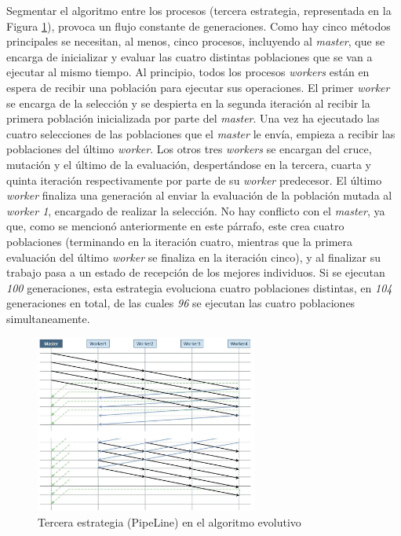 	Segmentar el algoritmo entre los procesos (tercera estrategia, representada en la Figura \ref{fig:pev_mpi3}), provoca un flujo constante de generaciones. Como hay cinco métodos principales se necesitan, al menos, cinco procesos, incluyendo al \textit{master}, que se encarga de inicializar y evaluar las cuatro distintas poblaciones que se van a ejecutar al mismo tiempo. Al principio, todos los procesos \textit{workers} están en espera de recibir una población para ejecutar sus operaciones. El primer \textit{worker} se encarga de la selección y se despierta en la segunda iteración al recibir la primera población inicializada por parte del \textit{master}. Una vez ha ejecutado las cuatro selecciones de las poblaciones que el \textit{master} le envía, empieza a recibir las poblaciones del último \textit{worker}. Los otros tres \textit{workers} se encargan del cruce, mutación y el último de la evaluación, despertándose en la tercera, cuarta y quinta iteración respectivamente por parte de su \textit{worker} predecesor. El último \textit{worker} finaliza una generación al enviar la evaluación de la población mutada al \textit{worker 1}, encargado de realizar la selección. No hay conflicto con el \textit{master}, ya que, como se mencionó anteriormente en este párrafo, este crea cuatro poblaciones (terminando en la iteración cuatro, mientras que la primera evaluación del último \textit{worker} se finaliza en la iteración cinco), y al finalizar su trabajo pasa a un estado de recepción de los mejores individuos. Si se ejecutan \textit{100} generaciones, esta estrategia evoluciona cuatro poblaciones distintas, en \textit{104} generaciones en total, de las cuales \textit{96} se ejecutan las cuatro poblaciones simultaneamente.
	
	
		
	\begin{figure}[!h]
		\centering
		\includegraphics[width=0.65\textwidth]{images/chapter_3/pev_mpi3}
		\caption{Tercera estrategia (PipeLine) en el algoritmo evolutivo }
		\label{fig:pev_mpi3}
	\end{figure}

